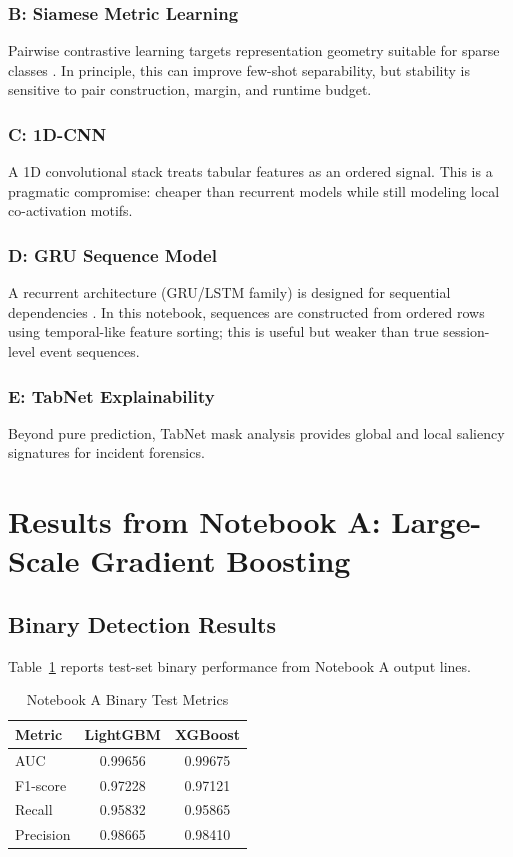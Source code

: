 \documentclass[10pt,journal]{IEEEtran}
\begin{document}
\subsubsection{B: Siamese Metric Learning}
Pairwise contrastive learning targets representation geometry suitable for sparse classes \cite{koch2015siamese}. In principle, this can improve few-shot separability, but stability is sensitive to pair construction, margin, and runtime budget.

\subsubsection{C: 1D-CNN}
A 1D convolutional stack treats tabular features as an ordered signal. This is a pragmatic compromise: cheaper than recurrent models while still modeling local co-activation motifs.

\subsubsection{D: GRU Sequence Model}
A recurrent architecture (GRU/LSTM family) is designed for sequential dependencies \cite{cho2014gru,hochreiter1997lstm}. In this notebook, sequences are constructed from ordered rows using temporal-like feature sorting; this is useful but weaker than true session-level event sequences.

\subsubsection{E: TabNet Explainability}
Beyond pure prediction, TabNet mask analysis provides global and local saliency signatures for incident forensics.

\section{Results from Notebook A: Large-Scale Gradient Boosting}
\subsection{Binary Detection Results}
Table~\ref{tab:gb_binary} reports test-set binary performance from Notebook A output lines.

\begin{table}[!t]
\caption{Notebook A Binary Test Metrics}
\label{tab:gb_binary}
\centering
\begin{tabular}{lcc}
\toprule
Metric & LightGBM & XGBoost \\
\midrule
AUC & 0.99656 & 0.99675 \\
F1-score & 0.97228 & 0.97121 \\
Recall & 0.95832 & 0.95865 \\
Precision & 0.98665 & 0.98410 \\
\bottomrule
\end{tabular}
\end{table}
\end{document}

